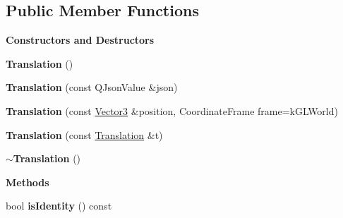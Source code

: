 \subsection*{Public Member Functions}
\begin{Indent}\textbf{ Constructors and Destructors}\par
\begin{DoxyCompactItemize}
\item 
\mbox{\label{structrev_1_1_translation_a226663b318a1849df7658094c9634d96}} 
{\bfseries Translation} ()
\item 
\mbox{\label{structrev_1_1_translation_a2a13e6395b78e9cf0b0e1f4f43ee5368}} 
{\bfseries Translation} (const Q\+Json\+Value \&json)
\item 
\mbox{\label{structrev_1_1_translation_a6f36e580f1487cf927146380684c3cc8}} 
{\bfseries Translation} (const \mbox{\hyperlink{classrev_1_1_vector}{Vector3}} \&position, Coordinate\+Frame frame=k\+G\+L\+World)
\item 
\mbox{\label{structrev_1_1_translation_a213c8b2c409f9347f5955a4ad1b52caa}} 
{\bfseries Translation} (const \mbox{\hyperlink{structrev_1_1_translation}{Translation}} \&t)
\item 
\mbox{\label{structrev_1_1_translation_a6df2fa48f3327480702563910dc8bcef}} 
{\bfseries $\sim$\+Translation} ()
\end{DoxyCompactItemize}
\end{Indent}
\begin{Indent}\textbf{ Methods}\par
\begin{DoxyCompactItemize}
\item 
\mbox{\label{structrev_1_1_translation_a633b2fbff1cba5b8ebdc023204064bfc}} 
bool {\bfseries is\+Identity} () const
\end{DoxyCompactItemize}
\end{Indent}
